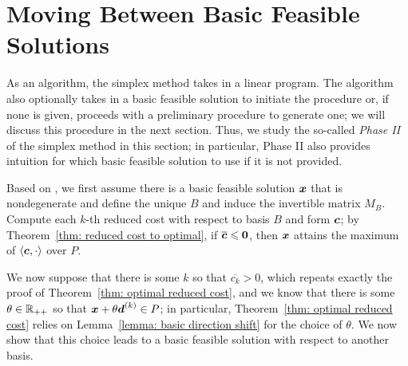 
\section{Moving Between Basic Feasible Solutions}

As an algorithm, the simplex method takes in a linear program. The algorithm also optionally takes in a basic feasible solution to initiate the procedure or, if none is given, proceeds with a preliminary procedure to generate one; we will discuss this procedure in the next section. Thus, we study the so-called {\em Phase II} of the simplex method in this section; in particular, Phase II also provides intuition for which basic feasible solution to use if it is not provided. 

Based on \LPSA, we first assume there is a basic feasible solution ${\boldsymbol x}$  that is nondegenerate and define the unique $B$ and induce the invertible matrix $M_B$. Compute each $k$-th reduced cost with respect to basis $B$ and form ${\boldsymbol c}$; by Theorem~\ref{thm: reduced cost to optimal}, if $\overline{{\boldsymbol c}} \leqslant \boldsymbol0$, then ${\boldsymbol x}$ attains the maximum of $\left\langle{\boldsymbol c}, \cdot\right\rangle$ over $P$. 

We now suppose that there is some $k$ so that $\overline{c_k} > 0$, which repeats exactly the proof of Theorem~\ref{thm: optimal reduced cost}, and we know that there is some $\theta \in \mathbb R_{++}$ so that ${\boldsymbol x} + \theta {\boldsymbol d}^{(k)} \in P$; in particular, Theorem~\ref{thm: optimal reduced cost} relies on Lemma~\ref{lemma: basic direction shift} for the choice of $\theta$. We now show that this choice leads to a basic feasible solution with respect to another basis. 


